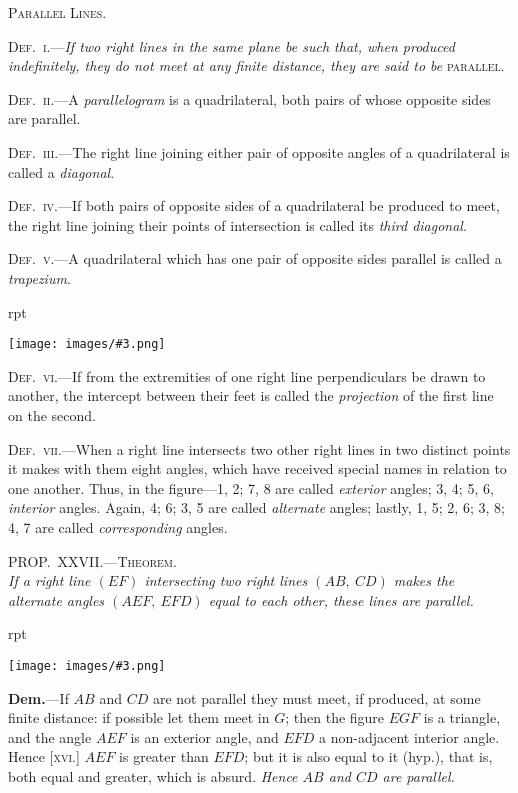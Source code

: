 \documentclass[oneside]{book}
\newcounter{wrapwidth}
\newcommand\myprop[2]{
\bigskip\Needspace*{4\baselineskip}\begin{center}\textsc{#1}\\\medskip\emph{#2}\par\end{center}
}
\newcommand\imgflow[3]{
\setcounter{wrapwidth}{#1}
\begin{wrapfigure}[#2]{r}{\value{wrapwidth}pt}
\begin{center}
\vspace{-0.3in}
\texttt{[image: images/\#3.png]}
\end{center}
\end{wrapfigure}
}
\begin{document}
\begin{center}
\textsc{Parallel Lines.}
\end{center}

\textsc{Def.~i.}---\textit{If two right lines in the same plane be such
that, when produced indefinitely, they do not meet at any
finite distance, they are said to be} \textsc{parallel}.

\textsc{Def.~ii.}---A \emph{parallelogram} is a quadrilateral, both
pairs of whose opposite sides are parallel.


\textsc{Def.~iii}.---The right line joining either pair of opposite
angles of a quadrilateral is called a \emph{diagonal}.

\textsc{Def.~iv}.---If both pairs of opposite sides of a quadrilateral
be produced to meet, the right line joining their
points of intersection is called its \emph{third diagonal}.

\textsc{Def.~v}.---A quadrilateral which has one pair of opposite
sides parallel is called a \emph{trapezium}.

\imgflow{110}{8}{f046}

\textsc{Def.~vi}.---If from the extremities of one right line
perpendiculars be drawn to another, the intercept between
their feet is called the \emph{projection} of the first line
on the second.

\textsc{Def.~vii}\label{def8}.---When a right line
intersects two other right lines
in two distinct points it makes
with them eight angles, which
have received special names in
relation to one another. Thus,
in the figure---1, 2; 7, 8 are
called \emph{exterior} angles; 3, 4; 5, 6, \emph{interior} angles.
Again, 4; 6; 3, 5 are called \emph{alternate} angles; lastly,
1, 5; 2, 6; 3, 8; 4, 7 are called \emph{corresponding} angles.

\myprop{PROP\@.~XXVII\@.---Theorem.}{If a right line $(EF)$ intersecting two right lines $(AB,\
CD)$ makes the alternate angles $(AEF,\ EFD)$ equal to
each other, these lines are parallel.}

\imgflow{160}{7}{f047}

\textbf{Dem.}---If $AB$ and $CD$ are not parallel they must meet,
if produced, at some finite
distance: if possible let
them meet in $G$; then
the figure $EGF$ is a triangle,
and the angle $AEF$
is an exterior angle, and
$EFD$ a non-adjacent interior
angle. Hence [\textsc{xvi.}] $AEF$ is greater than $EFD$;
but it is also equal to it (hyp.), that is, both equal and
greater, which is absurd. \emph{Hence $AB$ and $CD$ are
parallel.}\par\medskip
\end{document}
